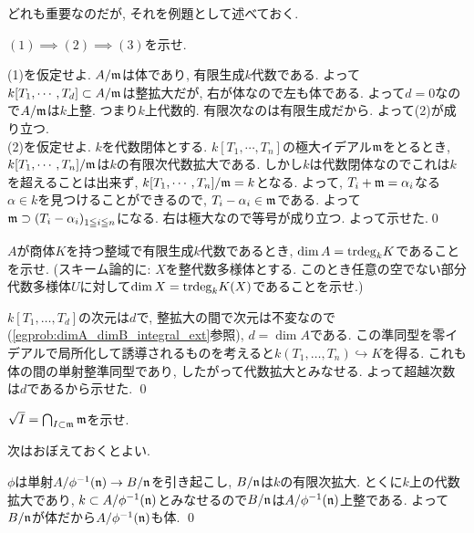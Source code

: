 どれも重要なのだが,  それを例題として述べておく.
\begin{egprob}
$(1)\implies (2) \implies (3)$を示せ.
\end{egprob}
\begin{egans}
(1)を仮定せよ. $A/\mathfrak{m}$は体であり, 有限生成$k$代数である. よって$k[T_1,\cdots, T_d]\subset A/\mathfrak{m}$は整拡大だが, 右が体なので左も体である. よって$d=0$なので$A/\mathfrak{m}$は$k$上整. つまり$k$上代数的. 有限次なのは有限生成だから. よって(2)が成り立つ. \\
(2)を仮定せよ. $k$を代数閉体とする. $k[T_1,\cdots, T_n]$の極大イデアル$\mathfrak{m}$をとるとき, $k[T_1,\cdots, T_n]/\mathfrak{m}$は$k$の有限次代数拡大である. しかし$k$は代数閉体なのでこれは$k$を超えることは出来ず, $k[T_1,\cdots, T_n]/\mathfrak{m} = k$となる. よって, $T_i + \mathfrak{m} = \alpha_i$なる$\alpha\in k$を見つけることができるので, $T_i - \alpha_i \in \mathfrak{m}$である. よって$\mathfrak{m}\supset (T_i - \alpha_i)_{1\leqq i\leqq n}$になる. 右は極大なので等号が成り立つ. よって示せた.\qed

\begin{egprob}
$A$が商体$K$を持つ整域で有限生成$k$代数であるとき, $\dim{A} = \mathrm{trdeg}_{k}K$であることを示せ. (スキーム論的に: $X$を整代数多様体とする. このとき任意の空でない部分代数多様体$U$に対して$\dim{X} = \mathrm{trdeg}_{k}K(X)$であることを示せ.)
\end{egprob}
\begin{egans}
 $k[T_1,\dots,T_d]$の次元は$d$で, 整拡大の間で次元は不変なので(\ref{egprob:dimA_dimB_integral_ext}参照), $d=\dim{A}$である. この準同型を零イデアルで局所化して誘導されるものを考えると$k(T_1,\dots, T_n) \hookrightarrow K$を得る. これも体の間の単射整準同型であり, したがって代数拡大とみなせる. よって超越次数は$d$であるから示せた. \qed
\end{egans}




\begin{egprob}
$\sqrt{I} = \bigcap_{I\subset \mathfrak{m}} \mathfrak{m}$を示せ.
\end{egprob}
次はおぼえておくとよい.
\begin{egans}
$\phi$は単射$A/\phi^{-1}(\mathfrak{n})\to B/\mathfrak{n}$を引き起こし, $B/\mathfrak{n}$は$k$の有限次拡大. とくに$k$上の代数拡大であり, $k\subset A/\phi^{-1}(\mathfrak{n})$とみなせるので$B/\mathfrak{n}$は$A/\phi^{-1}(\mathfrak{n})$上整である. よって$B/\mathfrak{n}$が体だから$A/\phi^{-1}(\mathfrak{n})$も体. \qed
\end{egans}


\end{egans}
